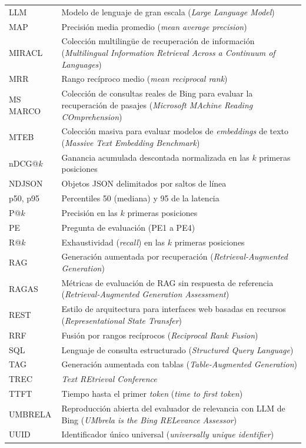 {\begin{longtable}[l]{>{\raggedright\arraybackslash}p{2.2cm}>{\raggedright\arraybackslash}p{12cm}}
LLM & Modelo de lenguaje de gran escala (\textit{Large Language Model}) \\
MAP & Precisión media promedio (\textit{mean average precision}) \\
MIRACL & Colección multilingüe de recuperación de información (\textit{Multilingual Information Retrieval Across a Continuum of Languages}) \\
MRR & Rango recíproco medio (\textit{mean reciprocal rank}) \\
MS MARCO & Colección de consultas reales de Bing para evaluar la recuperación de pasajes (\textit{Microsoft MAchine Reading COmprehension}) \\
MTEB & Colección masiva para evaluar modelos de \textit{embeddings} de texto (\textit{Massive Text Embedding Benchmark}) \\
nDCG@$k$ & Ganancia acumulada descontada normalizada en las $k$ primeras posiciones \\
NDJSON & Objetos JSON delimitados por saltos de línea \\
p50, p95 & Percentiles 50 (mediana) y 95 de la latencia \\
P@$k$ & Precisión en las $k$ primeras posiciones \\
PE & Pregunta de evaluación (PE1 a PE4) \\
R@$k$ & Exhaustividad (\textit{recall}) en las $k$ primeras posiciones \\
RAG & Generación aumentada por recuperación (\textit{Retrieval-Augmented Generation}) \\
RAGAS & Métricas de evaluación de RAG sin respuesta de referencia (\textit{Retrieval-Augmented Generation Assessment}) \\
REST & Estilo de arquitectura para interfaces web basadas en recursos (\textit{Representational State Transfer}) \\
RRF & Fusión por rangos recíprocos (\textit{Reciprocal Rank Fusion}) \\
SQL & Lenguaje de consulta estructurado (\textit{Structured Query Language}) \\
TAG & Generación aumentada con tablas (\textit{Table-Augmented Generation}) \\
TREC & \textit{Text REtrieval Conference} \\
TTFT & Tiempo hasta el primer \textit{token} (\textit{time to first token}) \\
UMBRELA & Reproducción abierta del evaluador de relevancia con LLM de Bing (\textit{UMbrela is the Bing RELevance Assessor}) \\
UUID & Identificador único universal (\textit{universally unique identifier}) \\
\end{longtable}
}
